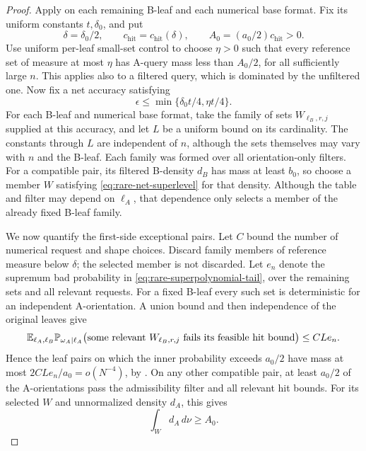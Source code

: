 \begin{proof}
Apply  on each remaining B-leaf
and each numerical base format.
Fix its uniform constants \(t,\delta_0\), and put
\[
 \delta=\delta_0/2,\qquad
 c_{\mathrm{hit}}=c_{\mathrm{hit}}(\delta),\qquad
 A_0=(a_0/2)c_{\mathrm{hit}}>0.
\]
Use uniform per-leaf small-set control to choose \(\eta>0\) such that
every reference set of measure at most \(\eta\) has A-query mass
less than \(A_0/2\), for all sufficiently large \(n\).
This applies also to a filtered query, which is dominated by the
unfiltered one.  Now fix a net accuracy satisfying
\[
          \epsilon\le
          \min\{\delta_0t/4,\eta t/4\}.
\]
For each B-leaf and numerical base format, take the family of sets
\(W_{\ell_B,r,j}\) supplied at this accuracy, and let \(L\) be a
uniform bound on its cardinality.  The constants through \(L\) are
independent of \(n\), although the sets themselves may vary with \(n\)
and the B-leaf.  Each family was formed over all orientation-only filters.
For a compatible pair, its filtered B-density \(d_B\) has mass at
least \(b_0\), so choose a member \(W\) satisfying
\eqref{eq:rare-net-superlevel} for that density.
Although the table and filter may depend on \(\ell_A\), that
dependence only selects a member of the already fixed B-leaf family.

We now quantify the first-side exceptional pairs.
Let \(C\) bound the number of numerical request and shape choices.
Discard family members of reference measure below \(\delta\);
the selected member is not discarded.
Let \(e_n\) denote the supremum bad probability in
\eqref{eq:rare-superpolynomial-tail}, over the remaining sets and
all relevant requests.
For a fixed B-leaf every such set is deterministic for an independent
A-orientation.  A union bound and then independence of the original
leaves give
\begin{equation}
 \mathbb E_{\ell_A,\ell_B}
 \mathbb P_{\omega_A\mid\ell_A}
 \bigl(\text{some relevant }W_{\ell_B,r,j}
       \text{ fails its feasible hit bound}\bigr)
 \le CL e_n .
 \label{eq:rare-independent-net-error}
\end{equation}
Hence the leaf pairs on which the inner probability exceeds \(a_0/2\)
have mass at most \(2CL e_n/a_0=o(N^{-4})\), by
.
On any other compatible pair, at least \(a_0/2\) of the A-orientations
pass the admissibility filter and all relevant hit bounds.  For its
selected \(W\) and unnormalized density \(d_A\), this gives
\begin{equation}
       \int_W d_A\,d\nu\ge A_0.
 \label{eq:rare-a-hit}
\end{equation}


\end{proof}
